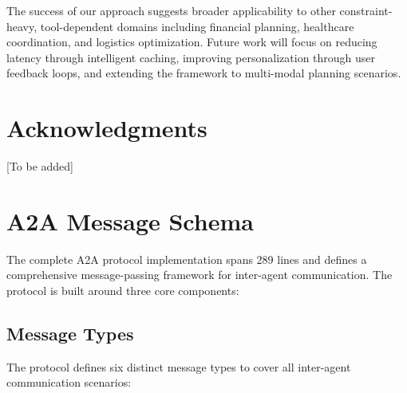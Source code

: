 \documentclass[preprint,review,12pt]{elsarticle}
\begin{document}
The success of our approach suggests broader applicability to other constraint-heavy, tool-dependent domains including financial planning, healthcare coordination, and logistics optimization. Future work will focus on reducing latency through intelligent caching, improving personalization through user feedback loops, and extending the framework to multi-modal planning scenarios.

\section*{Acknowledgments}
[To be added]




\appendix

\section{A2A Message Schema}
\label{appendix:a2a}

The complete A2A protocol implementation spans 289 lines and defines a comprehensive message-passing framework for inter-agent communication. The protocol is built around three core components:

\subsection*{Message Types}

The protocol defines six distinct message types to cover all inter-agent communication scenarios:
\end{document}
